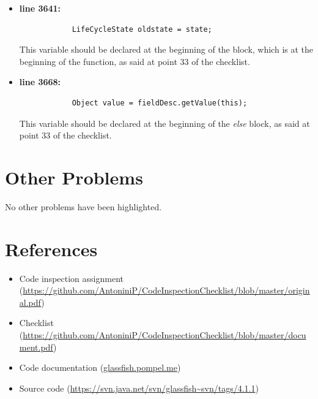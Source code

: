 \documentclass[18pt,oneside,a4paper, titlepage]{article}
\begin{document}
\begin{itemize}
			\item \textbf{line 3641:} \begin{lstlisting}
			LifeCycleState oldstate = state;
			\end{lstlisting}
			\vspace{0.1cm}
			This variable should be declared at the beginning of the block, which is at the beginning of the function, as said at point 33 of the checklist.
			\item \textbf{line 3668:}  \begin{lstlisting}
			Object value = fieldDesc.getValue(this);
			\end{lstlisting}
			\vspace{0.1cm}
			This variable should be declared at the beginning of the \textit{else} block, as said at point 33 of the checklist.
		\end{itemize}

\newpage
\section{Other Problems}
	No other problems have been highlighted.
\section{References}
	\begin{itemize}
		\item Code inspection assignment\\ (\url{https://github.com/AntoniniP/CodeInspectionChecklist/blob/master/original.pdf})
		\item Checklist\\ (\url{https://github.com/AntoniniP/CodeInspectionChecklist/blob/master/document.pdf})
		\item Code documentation (\url{glassfish.pompel.me})
		\item Source code (\url{https://svn.java.net/svn/glassfish~svn/tags/4.1.1})
	\end{itemize}
	
\end{document}
